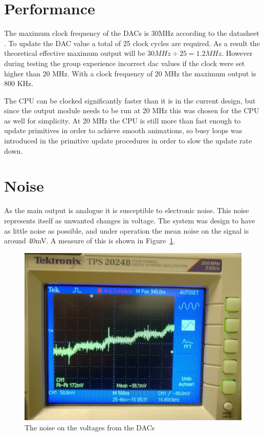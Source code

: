 \section{Performance}

The maximum clock frequency of the DACs is 30MHz according to the datasheet \cite{dac-datasheet}.
To update the DAC value a total of 25 clock cycles are required.
As a result the theoretical effective maximum output will be \(30 MHz \div 25 = 1.2 MHz \).
However during testing the group experience incorrect \gls{dac} values if the clock were set higher than 20 MHz.
With a clock frequency of 20 MHz the maximum output is 800 KHz.

The CPU can be clocked significantly faster than it is in the current design, but since the output module needs to be run at 20 MHz this was chosen for the CPU as well for simplicity.
At 20 MHz the CPU is still more than fast enough to update primitives in order to achieve smooth animations, so busy loops was introduced in the primitive update procedures in order to slow the update rate down.

\section{Noise}
\label{sec:noise}
As the main output is analogue it is susceptible to electronic noise. This noise represents itself as unwanted changes in voltage. 
The system was design to have as little noise as possible, and under operation the mean noise on the signal is around 40mV.
A measure of this is shown in Figure~\ref{fig:noise}.

\begin{figure}[H]
	    \includegraphics[width=\linewidth]{images/noise}
	    \caption{The noise on the voltages from the DACs}
	    \label{fig:noise}
\end{figure}

